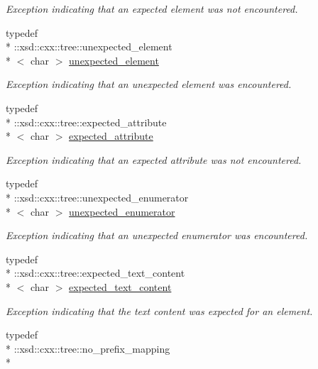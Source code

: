\begin{DoxyCompactItemize}
\begin{DoxyCompactList}\small\item\em Exception indicating that an expected element was not encountered. \end{DoxyCompactList}\item 
typedef \\*
\-::xsd\-::cxx\-::tree\-::unexpected\-\_\-element\\*
$<$ char $>$ \hyperlink{namespacexml__schema_a381b3f3410f9f6ba1f44c5500d90345b}{unexpected\-\_\-element}
\begin{DoxyCompactList}\small\item\em Exception indicating that an unexpected element was encountered. \end{DoxyCompactList}\item 
typedef \\*
\-::xsd\-::cxx\-::tree\-::expected\-\_\-attribute\\*
$<$ char $>$ \hyperlink{namespacexml__schema_af16d098ecb2b5ba96a0734aa34bd8a5b}{expected\-\_\-attribute}
\begin{DoxyCompactList}\small\item\em Exception indicating that an expected attribute was not encountered. \end{DoxyCompactList}\item 
typedef \\*
\-::xsd\-::cxx\-::tree\-::unexpected\-\_\-enumerator\\*
$<$ char $>$ \hyperlink{namespacexml__schema_a7601f5d15eeb816df6a0e1cb2b0f379b}{unexpected\-\_\-enumerator}
\begin{DoxyCompactList}\small\item\em Exception indicating that an unexpected enumerator was encountered. \end{DoxyCompactList}\item 
typedef \\*
\-::xsd\-::cxx\-::tree\-::expected\-\_\-text\-\_\-content\\*
$<$ char $>$ \hyperlink{namespacexml__schema_ad0938777db5685ea04372a964518e87b}{expected\-\_\-text\-\_\-content}
\begin{DoxyCompactList}\small\item\em Exception indicating that the text content was expected for an element. \end{DoxyCompactList}\item 
typedef \\*
\-::xsd\-::cxx\-::tree\-::no\-\_\-prefix\-\_\-mapping\\*

\end{DoxyCompactItemize}
